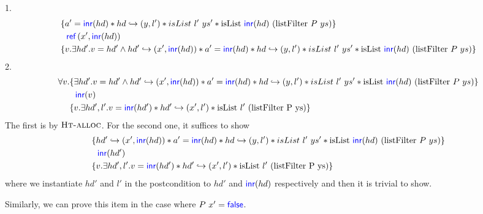 \documentclass{article}
\begin{document}
1.
\begin{align*}
     & \{a' = \Inr(hd) \star hd \gmapsto (y, l') \star isList \ l' \ ys' \star \text{isList} \ \Inr(hd) \ (\text{listFilter} \ P \ ys)\}                                                                  \\
     & \ \ \Ref(x', \Inr(hd))                                                                                                                                                                             \\
     & \{v. \exists hd'. v = hd' \wedge hd' \gmapsto (x', \Inr(hd)) \star a' = \Inr(hd) \star hd \gmapsto (y, l') \star isList \ l' \ ys' \star \text{isList} \ \Inr(hd) \ (\text{listFilter} \ P \ ys)\} \\
\end{align*}
2.
\begin{align*}
    \forall v. & \{\exists hd'. v = hd' \wedge hd' \gmapsto (x', \Inr(hd)) \star a' = \Inr(hd) \star hd \gmapsto (y, l') \star isList \ l' \ ys' \star \text{isList} \ \Inr(hd) \ (\text{listFilter} \ P \ ys)\} \\
               & \ \ \Inr(v)                                                                                                                                                                                     \\
               & \{v. \exists hd', l'. v = \Inr(hd') \star hd' \gmapsto (x', l') \star \text{isList} \ l' \ (\text{listFilter P ys})\}
\end{align*}
The first is by $\textsc{Ht-alloc}$. For the second one, it suffices to show
\begin{align*}
     & \{hd' \gmapsto (x', \Inr(hd)) \star a' = \Inr(hd) \star hd \gmapsto (y, l') \star isList \ l' \ ys' \star \text{isList} \ \Inr(hd) \ (\text{listFilter} \ P \ ys)\} \\
     & \ \ \Inr(hd')                                                                                                                                                       \\
     & \{v. \exists hd', l'. v = \Inr(hd') \star hd' \gmapsto (x', l') \star \text{isList} \ l' \ (\text{listFilter P ys})\}
\end{align*}
where we instantiate $hd'$ and $l'$ in the postcondition to $hd'$ and $\textsf{\color{blue} inr}(hd)$ respectively and then it is trivial to show.

Similarly, we can prove this item in the case where $P \ x' = \textsf{\color{blue} false}$.
\end{document}
